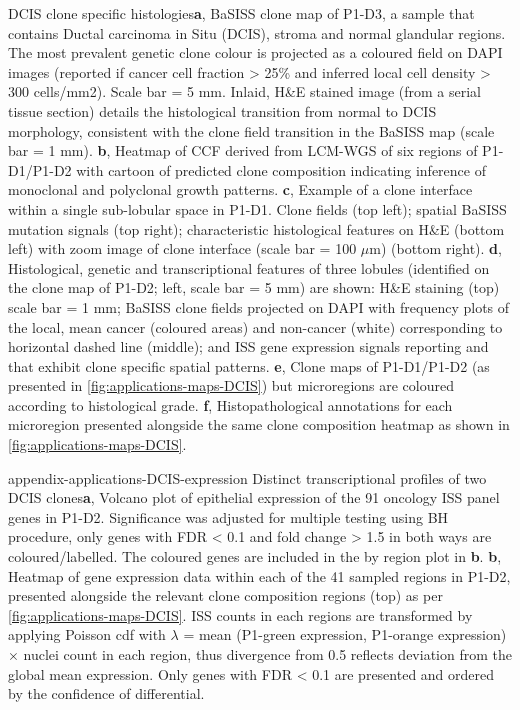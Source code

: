     {DCIS clone specific histologies}{\textbf{a}, \ac{BaSISS} clone map of P1-D3, a sample that contains Ductal carcinoma in Situ (DCIS), stroma and normal glandular regions. The most prevalent genetic clone colour is projected as a coloured field on DAPI images (reported if cancer cell fraction > 25\% and inferred local cell density > 300 cells/mm2). Scale bar = 5 mm. Inlaid, H\&E stained image (from a serial tissue section) details the histological transition from normal to DCIS morphology, consistent with the clone field transition in the \ac{BaSISS} map (scale bar = 1 mm). \textbf{b}, Heatmap of \ac{CCF} derived from \ac{LCM}-\ac{WGS} of six regions of P1-D1/P1-D2 with cartoon of predicted clone composition indicating inference of monoclonal and polyclonal growth patterns. \textbf{c}, Example of a clone interface within a single sub-lobular space in P1-D1. Clone fields (top left); spatial \ac{BaSISS} mutation signals (top right); characteristic histological features on H\&E (bottom left) with zoom image of clone interface (scale bar = 100 $\mu$m) (bottom right). \textbf{d}, Histological, genetic and transcriptional features of three lobules (identified on the clone map of P1-D2; left, scale bar = 5 mm) are shown: H\&E staining (top) scale bar = 1 mm; \ac{BaSISS} clone fields projected on DAPI with frequency plots of the local, mean cancer (coloured areas) and non-cancer (white) corresponding to horizontal dashed line (middle); and \ac{ISS} gene expression signals reporting  and  that exhibit clone specific spatial patterns. \textbf{e}, Clone maps of P1-D1/P1-D2 (as presented in \cref{fig:applications-maps-DCIS}) but microregions are coloured according to histological grade. \textbf{f}, Histopathological annotations for each microregion presented alongside the same clone composition heatmap as shown in \cref{fig:applications-maps-DCIS}.}

    {appendix-applications-DCIS-expression}
    {Distinct transcriptional profiles of two \ac{DCIS} clones}{\textbf{a}, Volcano plot of epithelial expression of the 91 oncology \ac{ISS} panel genes in P1-D2. Significance was adjusted for multiple testing using BH procedure, only genes with \ac{FDR} < 0.1 and fold change > 1.5 in both ways are coloured/labelled. The coloured genes are included in the by region plot in \textbf{b}. \textbf{b}, Heatmap of gene expression data within each of the 41 sampled regions in P1-D2, presented alongside the relevant clone composition regions (top) as per \cref{fig:applications-maps-DCIS}. \ac{ISS} counts in each regions are transformed by applying Poisson cdf with $\lambda$ = mean (P1-green expression, P1-orange expression) $\times$ nuclei count in each region, thus divergence from 0.5 reflects deviation from the global mean expression. Only genes with \ac{FDR} < 0.1 are presented and ordered by the confidence of differential.}

